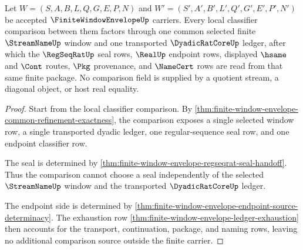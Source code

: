\begin{theorem}
\label{thm:finite-window-envelope-common-window-lock}
Let $W=(S,A,B,L,Q,G,E,P,N)$ and $W'=(S',A',B',L',Q',G',E',P',N')$ be accepted $\FiniteWindowEnvelopeUp$ carriers. Every local classifier comparison between them factors through one common selected finite $\StreamNameUp$ window and one transported $\DyadicRatCoreUp$ ledger, after which the $\RegSeqRatUp$ seal rows, $\RealUp$ endpoint rows, displayed $\hsame$ and $\Cont$ routes, $\Pkg$ provenance, and $\NameCert$ rows are read from that same finite package. No comparison field is supplied by a quotient stream, a diagonal object, or host real equality.
\end{theorem}
\begin{proof}
Start from the local classifier comparison. By \autoref{thm:finite-window-envelope-common-refinement-exactness}, the comparison exposes a single selected window row, a single transported dyadic ledger, one regular-sequence seal row, and one endpoint classifier row.

The seal is determined by \autoref{thm:finite-window-envelope-regseqrat-seal-handoff}. Thus the comparison cannot choose a seal independently of the selected $\StreamNameUp$ window and the transported $\DyadicRatCoreUp$ ledger.

The endpoint side is determined by \autoref{thm:finite-window-envelope-endpoint-source-determinacy}. The exhaustion row \autoref{thm:finite-window-envelope-ledger-exhaustion} then accounts for the transport, continuation, package, and naming rows, leaving no additional comparison source outside the finite carrier.
\end{proof}

